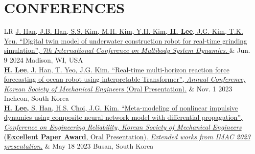 \documentclass[a4paper,10pt]{extarticle}
\begin{document}
\section*{CONFERENCES}
\noindent
{}
\vspace*{-.5cm}
\begin{longtable}{LR}
	\href{https://easychair.org/publications/preprint/WkF3}{J. Han, J.B. Han, S.S. Kim, M.H. Kim, Y.H. Kim, \textbf{H. Lee}, J.G. Kim, T.K. Yeu. “Digital twin model of underwater construction robot for real-time grinding simulation”, \textit{7th International Conference on Multibody System Dynamics}. }                                                                                                                                  & {Jun. 9 2024 \linebreak Madison, WI, USA}     \\
	\href{https://www.dbpia.co.kr/Journal/articleDetail?nodeId=NODE11709087}{\textbf{H. Lee}, J. Han, T. Yeo, J.G. Kim. “Real-time multi-horizon reaction force forecasting of ocean robot using interpretable Transformer”, \textit{Annual Conference, Korean Society of Mechanical Engineers} (Oral Presentation).}                                                                                                                            & {Nov. 1 2023 \linebreak Incheon, South Korea} \\
	\href{https://www.dbpia.co.kr/journal/articleDetail?nodeId=NODE11511050}{\textbf{H. Lee,} S. Han, H.S. Choi, J.G. Kim. “Meta-modeling of nonlinear impulsive dynamics using composite neural network model with differential propagation”, \textit{Conference on Engineering Reliability, Korean Society of Mechanical Engineers} (\textbf{Excellent Paper Award}, Oral Presentation). \textsl{Extended works from IMAC 2023 presentation.}} & {May 18 2023 \linebreak Busan, South Korea}   \\

\end{longtable}
\end{document}
